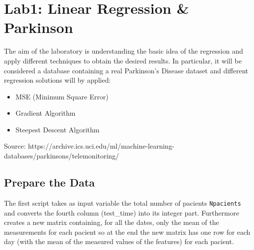 \documentclass[12pt]{article}
\begin{document}

\tableofcontents
\newpage

\section{Lab1: Linear Regression \& Parkinson}
The aim of the laboratory is understanding the basic idea of the regression and apply different techniques to obtain the desired results. In particular, it will be considered a database containing a real Parkinson's Disease dataset and different regression solutions will by applied:
\begin{itemize}
\item MSE (Minimum Square Error)
\item Gradient Algorithm
\item Steepest Descent Algorithm
\end{itemize} 
Source: \footnotesize{ https://archive.ics.uci.edu/ml/machine-learning-databases/parkinsons/telemonitoring/}

\subsection{Prepare the Data}
The first script takes as input variable the total number of pacients \texttt{Npacients} and converts the fourth column (test\_time) into its integer part.
Furthermore creates a new matrix containing, for all the dates, only the mean of the measurements for each pacient so at the end the new matrix has one row for each day (with the mean of the measured values of the features) for each pacient.
\end{document}
